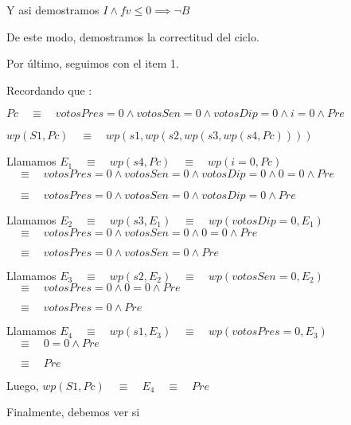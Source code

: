 \documentclass[10pt,a4paper]{article}
\begin{document}
\vspace{0.3cm}
Y asi demostramos $I \wedge fv \leq 0 \implies \neg B$

\vspace{0.6cm}
    De este modo, demostramos la correctitud del ciclo.

 \vspace{0.6cm}
     Por último, seguimos con el item 1.

\vspace{0.3cm}
	Recordando que :

	 $Pc \quad \equiv \quad votosPres = 0 \wedge votosSen = 0 \wedge votosDip = 0 \wedge i=0 \wedge Pre$

\vspace{0.3cm}
    $wp(S1, Pc) \quad \equiv \quad wp(s1, wp(s2, wp(s3, wp(s4, Pc))))$

\vspace{0.5cm}
    Llamamos $E_1 \quad \equiv \quad  wp(s4, Pc) \quad \equiv \quad wp(i = 0, Pc) $
    $\quad \equiv \quad votosPres = 0 \wedge votosSen = 0 \wedge votosDip = 0 \wedge 0=0 \wedge Pre$

    $\quad \equiv \quad votosPres = 0 \wedge votosSen = 0 \wedge votosDip = 0 \wedge Pre$

\vspace{0.5cm}
    Llamamos $E_2 \quad \equiv \quad wp(s3, E_1) \quad \equiv \quad wp(votosDip = 0, E_1)$
    $\quad \equiv \quad votosPres = 0 \wedge votosSen = 0 \wedge 0 = 0 \wedge Pre$
    
    $\quad \equiv \quad votosPres = 0 \wedge votosSen = 0 \wedge Pre$

\vspace{0.5cm}
    Llamamos $E_3 \quad \equiv \quad wp(s2, E_2) \quad \equiv \quad wp(votosSen = 0, E_2)$
    $\quad \equiv \quad votosPres = 0 \wedge 0 = 0 \wedge Pre$
    
    $\quad \equiv \quad votosPres = 0 \wedge Pre$

\vspace{0.5cm}
    Llamamos $E_4 \quad \equiv \quad wp(s1, E_3) \quad \equiv \quad wp(votosPres = 0, E_3)$
    $\quad \equiv \quad 0 = 0 \wedge Pre$

    $\quad \equiv \quad Pre$

\vspace{0.5cm}
    Luego, $wp(S1, Pc) \quad \equiv \quad E_4 \quad \equiv \quad Pre$

\vspace{0.5cm}
    Finalmente, debemos ver si 
\end{document}
